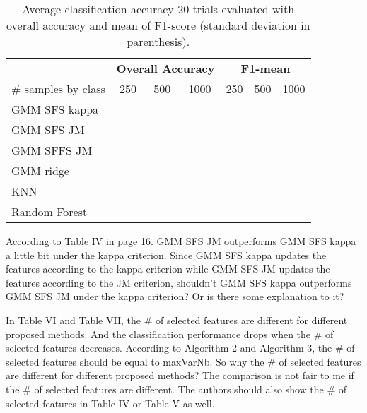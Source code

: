 \documentclass[a4paper,10pt,DIV=16]{scrartcl}
\begin{document}
    \begin{table}[!t]
        \centering
        \caption{Average classification accuracy 20 trials evaluated with overall accuracy and mean of F1-score (standard deviation in parenthesis).\label{tab:aisa-otbsimu-othereval}}
        \begin{tabular}{lcccccc}\toprule
             & \multicolumn{3}{c}{\bfseries Overall Accuracy} & \multicolumn{3}{c}{\bfseries F1-mean} \\ \cmidrule{2-7}
            \# samples by class & 250 & 500 & 1000  & 250 & 500 & 1000 \\ \midrule

            GMM SFS kappa & & & & & & \\
            GMM SFS JM &    & & & & & \\
            GMM SFFS JM &   & & & & & \\
            GMM ridge &     & & & & & \\
            KNN &           & & & & & \\
            Random Forest & & & & & & \\
            \bottomrule
        \end{tabular}
    \end{table}

\begin{revbox}
  According to Table IV in page 16. GMM SFS JM outperforms GMM SFS kappa a little bit under the kappa criterion. Since GMM SFS kappa updates the features according to the kappa criterion while GMM SFS JM updates the features according to the JM criterion, shouldn’t GMM SFS kappa outperforms GMM SFS JM under the kappa criterion? Or is there some explanation to it?
  \begin{resbox}

  \end{resbox}
\end{revbox}

\begin{revbox}
  In Table VI and Table VII, the \# of selected features are different for different proposed methods. And the classification performance drops when the \# of selected features decreases. According to Algorithm 2 and Algorithm 3, the \# of selected features should be equal to maxVarNb. So why the \# of selected features are different for different proposed methods? The comparison is not fair to me if the \# of selected features are different. The authors should also show the \# of selected features in Table IV or Table V as well.
  \begin{resbox}

  \end{resbox}
\end{revbox}
\end{document}
